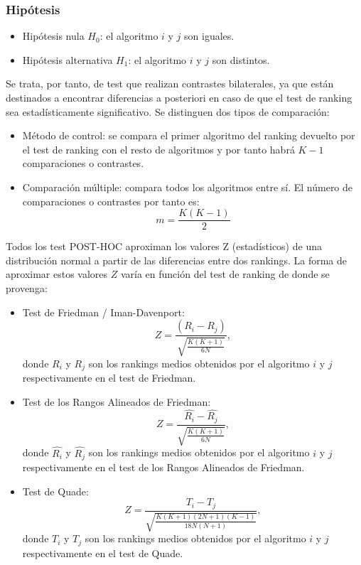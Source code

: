 \subsubsection{Hipótesis}
\begin{itemize}
\item Hipótesis nula $H_0$: el algoritmo $i$ y $j$ son iguales.
\item Hipótesis alternativa $H_1$: el algoritmo $i$ y $j$ son distintos.
\end{itemize}
Se trata, por tanto, de test que realizan contrastes bilaterales, ya que están destinados a encontrar diferencias
a posteriori en caso de que el test de ranking sea estadísticamente significativo. Se distinguen dos tipos de
comparación:

\begin{itemize}
\item Método de control: se compara el primer algoritmo del ranking devuelto por el test de ranking con el resto
de algoritmos y por tanto habrá $K-1$ comparaciones o contrastes.
\item Comparación múltiple: compara todos los algoritmos entre sí. El número de comparaciones o contrastes por
tanto es:
\[ m = \frac{K(K-1)}{2} \]
\end{itemize}

Todos los test POST-HOC aproximan los valores Z (estadísticos) de una distribución normal a partir de las
diferencias entre dos rankings. La forma de aproximar estos valores $Z$ varía en función del test de ranking de
donde se provenga:

\begin{itemize}
\item Test de Friedman / Iman-Davenport:
\[ Z = \frac{(R_i - R_j)}{\sqrt{\frac{K(K+1)}{6N}}}, \]
donde $R_i$ y $R_j$ son los rankings medios obtenidos por el algoritmo $i$ y $j$ respectivamente en el test
de Friedman.
\item Test de los Rangos Alineados de Friedman:
\[ Z = \frac{\hat{R_{i}} - \hat{R_{j}}}{\sqrt{\frac{K(K+1)}{6N}}}, \]
donde $\hat{R_{i}}$ y $\hat{R_{j}}$ son los rankings medios obtenidos por el algoritmo $i$ y $j$ respectivamente en el test
de los Rangos Alineados de Friedman.
\item Test de Quade:
\[ Z = \frac {T_i - T_j}{\sqrt{\frac{K(K+1)(2N+1)(K-1)}{18N(N+1)}}}, \]
donde $T_i$ y $T_j$ son los rankings medios obtenidos por el algoritmo $i$ y $j$ respectivamente en el test
de Quade.
\end{itemize}

